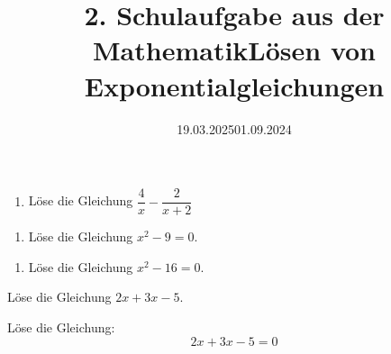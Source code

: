 \documentclass[points=left, 
solution,
textsize=12pt,
mathsize=14pt,
boxoffset=0.05cm
]{exam}
\date{19.03.2025}
\title{2. Schulaufgabe aus der Mathematik}
\date{01.09.2024}
\title{Lösen von Exponentialgleichungen}
\begin{document}

\lipsum[1]

\begin{enumerate}[label=\alph*), left=0pt]
    \item Löse die Gleichung $\dfrac{4}{ x} - \dfrac{2}{x+2}$
\end{enumerate}


\begin{enumerate}[label=\alph*), resume, left=0pt]
    \item Löse die Gleichung \(x^2 - 9 = 0\).
\end{enumerate}


\begin{enumerate}[label=\alph*), resume, left=0pt]
    \item Löse die Gleichung \(x^2 - 16 = 0\).
\end{enumerate}



Löse die Gleichung \(2x + 3x - 5\).


Löse die Gleichung:
\[
    2x + 3x - 5 = 0
\]
\thinkbubble[Test]


\totalpoints
\end{document}
